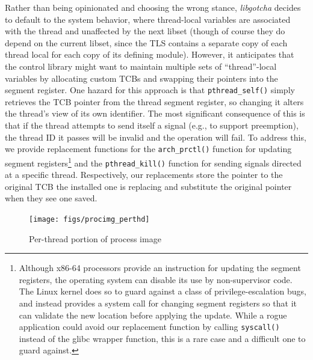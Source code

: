 Rather than being opinionated and choosing the wrong stance, \textit{libgotcha}
decides to default to the system behavior, where thread-local variables are
associated with the thread and unaffected by the next libset (though of course they
do depend on the current libset, since the TLS contains a separate copy of each
thread local for each copy of its defining module).  However, it anticipates that the
control library might want to maintain multiple sets of ``thread''-local variables by
allocating custom TCBs and swapping their pointers into the segment register.  One
hazard for this approach is that \texttt{pthread\_self()} simply retrieves the TCB
pointer from the thread segment register, so changing it alters the thread's view of
its own identifier.  The most significant consequence of this is that if the thread
attempts to send itself a signal (e.g., to support preemption), the thread ID it
passes will be invalid and the operation will fail.  To address this, we provide
replacement functions for the \texttt{arch\_prctl()} function for updating segment
registers\footnote{Although x86-64 processors provide an instruction for updating the
segment registers, the operating system can disable its use by non-supervisor code.
The Linux kernel does so to guard against a class of privilege-escalation bugs, and
instead provides a system call for changing segment registers so that it can validate
the new location before applying the update.  While a rogue application could avoid
our replacement function by calling \texttt{syscall()} instead of the glibc wrapper
function, this is a rare case and a difficult one to guard against.} and the
\texttt{pthread\_kill()} function for sending signals directed at a specific thread.
Respectively, our replacements store the pointer to the original TCB the installed
one is replacing and substitute the original pointer when they see one saved.

\begin{figure}
\texttt{[image: figs/procimg\_perthd]}
\caption{Per-thread portion of process image}
\label{fig:procimgthd}
\end{figure}

